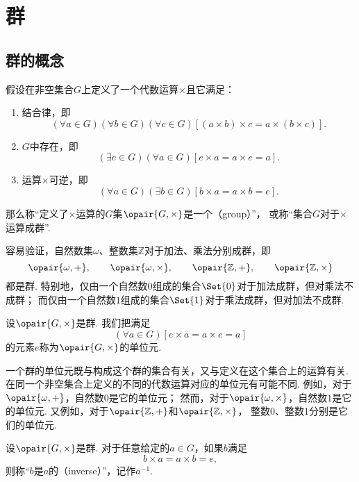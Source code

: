\section{群}
\subsection{群的概念}
\begin{definition}
假设在非空集合\(G\)上定义了一个代数运算\(\times\)且它满足：
\begin{enumerate}
    \item 结合律，即\[
        (\forall a \in G)(\forall b \in G)(\forall c \in G)
        [(a \times b) \times c = a \times (b \times c)].
    \]

    \item \(G\)中存在，即\[
        (\exists e \in G)(\forall a \in G)
        [e \times a = a \times e = a].
    \]

    \item 运算\(\times\)可逆，即\[
        (\forall a \in G)(\exists b \in G)
        [b \times a = a \times b = e].
    \]
\end{enumerate}
那么称“定义了\(\times\)运算的\(G\)集\(\opair{G,\times}\)是一个（group）”，
或称“集合\(G\)对于\(\times\)运算成群”.
\end{definition}

容易验证，自然数集\(\omega\)、整数集\(\mathbb{Z}\)对于加法、乘法分别成群，即\[
	\opair{\omega,+}, \qquad
	\opair{\omega,\times}, \qquad
	\opair{\mathbb{Z},+}, \qquad
	\opair{\mathbb{Z},\times}
\]都是群.
特别地，仅由一个自然数\(0\)组成的集合\(\Set{0}\)对于加法成群，但对乘法不成群；
而仅由一个自然数\(1\)组成的集合\(\Set{1}\)对于乘法成群，但对加法不成群.

\begin{definition}
设\(\opair{G,\times}\)是群.
我们把满足\[
    (\forall a \in G)
    [e \times a = a \times e = a]
\]的元素\(e\)称为\(\opair{G,\times}\)的单位元.
\end{definition}

一个群的单位元既与构成这个群的集合有关，又与定义在这个集合上的运算有关.
在同一个非空集合上定义的不同的代数运算对应的单位元有可能不同.
例如，对于\(\opair{\omega,+}\)，自然数\(0\)是它的单位元；
然而，对于\(\opair{\omega,\times}\)，自然数\(1\)是它的单位元.
又例如，对于\(\opair{\mathbb{Z},+}\)和\(\opair{\mathbb{Z},\times}\)，
整数\(0\)、整数\(1\)分别是它们的单位元.

\begin{definition}
设\(\opair{G,\times}\)是群.
对于任意给定的\(a \in G\)，如果\(b\)满足\[
    b \times a = a \times b = e,
\]
则称“\(b\)是\(a\)的（inverse）”，记作\(a^{-1}\).
\end{definition}

